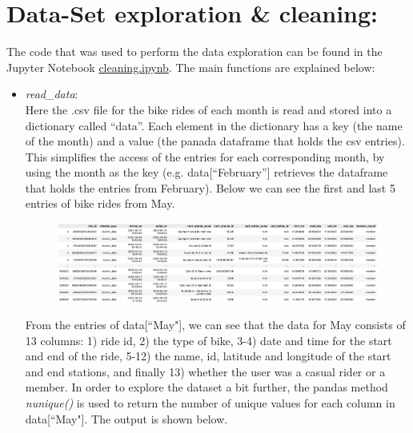 \documentclass[12pt]{article}
\begin{document}
\section*{Data-Set exploration \& cleaning:}
The code that was used to perform the data exploration can be found in the Jupyter Notebook \href{https://github.com/SummerKassem/BikeShareCS/blob/main/Code/cleaning.ipynb}{cleaning.ipynb}. The main functions are explained below:
\begin{itemize}
	\item \textit{read\_data}:\\
	Here the .csv file for the bike rides of each month is read and stored into a dictionary called “data”. Each element in the dictionary has a key (the name of the month) and a value (the panada dataframe that holds the csv entries). This simplifies the access of the entries for each corresponding month, by using the month as the key (e.g. data[“February”] retrieves the dataframe that holds the entries from February). Below we can see the first and last 5 entries of bike rides from May.

	\begin{figure}[h]
	\hspace{-1.8cm}
	\includegraphics[width=8 in, height = 2 in]{imgMay.png}
	\end{figure}
	\pagebreak
	
	From the entries of data[``May"], we can see that the data for May consists of 13 columns: 1) ride id, 2) the type of bike, 3-4) date and time for the start and end of the ride, 5-12) the name, id, latitude and longitude of the start and end stations, and finally 13) whether the user was a casual rider or a member. In order to explore the dataset a bit further, the pandas method \textit{nunique()} is used to return the number of unique values for each column in data[``May"]. The output is shown below. 
	

\end{itemize}
\end{document}
